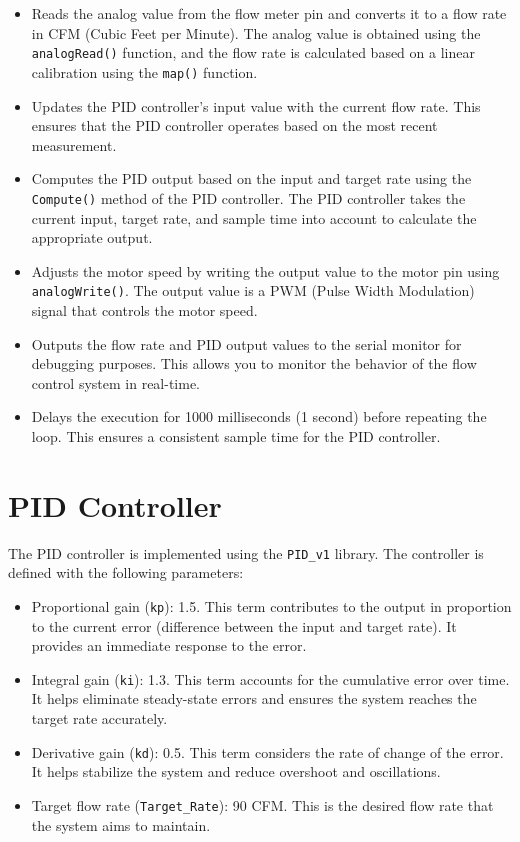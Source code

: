 \documentclass{article}
\begin{document}
\begin{itemize}
  \item Reads the analog value from the flow meter pin and converts it to a flow rate in CFM (Cubic Feet per Minute). The analog value is obtained using the \texttt{analogRead()} function, and the flow rate is calculated based on a linear calibration using the \texttt{map()} function.
  \item Updates the PID controller's input value with the current flow rate. This ensures that the PID controller operates based on the most recent measurement.
  \item Computes the PID output based on the input and target rate using the \texttt{Compute()} method of the PID controller. The PID controller takes the current input, target rate, and sample time into account to calculate the appropriate output.
  \item Adjusts the motor speed by writing the output value to the motor pin using \texttt{analogWrite()}. The output value is a PWM (Pulse Width Modulation) signal that controls the motor speed.
  \item Outputs the flow rate and PID output values to the serial monitor for debugging purposes. This allows you to monitor the behavior of the flow control system in real-time.
  \item Delays the execution for 1000 milliseconds (1 second) before repeating the loop. This ensures a consistent sample time for the PID controller.
\end{itemize}

\section*{PID Controller}
The PID controller is implemented using the \texttt{PID\_v1} library. The controller is defined with the following parameters:

\begin{itemize}
  \item Proportional gain (\texttt{kp}): 1.5. This term contributes to the output in proportion to the current error (difference between the input and target rate). It provides an immediate response to the error.
  \item Integral gain (\texttt{ki}): 1.3. This term accounts for the cumulative error over time. It helps eliminate steady-state errors and ensures the system reaches the target rate accurately.
  \item Derivative gain (\texttt{kd}): 0.5. This term considers the rate of change of the error. It helps stabilize the system and reduce overshoot and oscillations.
  \item Target flow rate (\texttt{Target\_Rate}): 90 CFM. This is the desired flow rate that the system aims to maintain.
\end{itemize}
\end{document}
